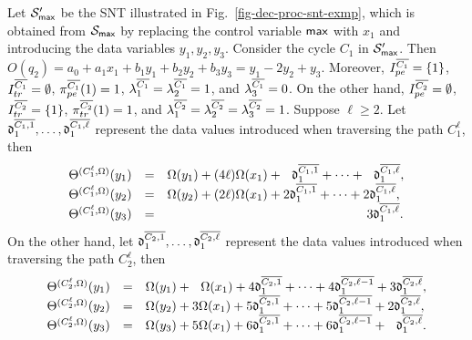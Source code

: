 \begin{example}\label{exmp-sum}
Let ${\mathcal{S} }'_{\sf max}$ be the SNT illustrated in Fig.~\ref{fig-dec-proc-snt-exmp}, which is obtained from ${\mathcal{S} }_{\sf max}$ by replacing  the control variable $\sf max$ with  $x_1$ and introducing the data variables $y_1,y_2, y_3$. Consider the cycle $C_1$ in ${\mathcal{S} }'_{\sf max}$. Then $O(q_2)= a_0 + a_1 x_1 + b_1 y_1 + b_2 y_2 + b_3 y_3 = y_1 - 2y_2 + y_3$. Moreover, $I^{\overline{C_1}}_{pe} = \{1\}$, $I^{\overline{C_1}}_{tr} = \emptyset$, $\pi^{\overline{C_1}}_{pe}(1) = 1$, $\lambda^{\overline{C_1}}_1 = \lambda^{\overline{C_1}}_2 = 1$, and $\lambda^{\overline{C_1}}_3 = 0$. On the other hand, $I^{\overline{C_2}}_{pe} = \emptyset$, $I^{\overline{C_2}}_{tr} = \{1\}$, $\pi^{\overline{C_2}}_{tr}(1) = 1$, and $\lambda^{\overline{C_2}}_1 = \lambda^{\overline{C_2}}_2 = \lambda^{\overline{C_2}}_3  = 1$. Suppose $\ell \ge 2$. Let $ \mathfrak{d}^{\overline{C_1, 1}}_1, \dots, \mathfrak{d}^{\overline{C_1, \ell}}_1$ represent the data values introduced when traversing the path $C^\ell_1$, then
\[
\begin{array}{l c l}
\sumf^{(C^\ell_1, \initval)}(y_1) &= & \initval(y_1) + (4 \ell) \initval(x_1) +\ \ \vard^{\circled{C_1, 1}}_1 + \dots +\ \ \vard^{\circled{C_1, \ell}}_1,\\
%
\sumf^{(C^\ell_1, \initval)}(y_2) &=& \initval(y_2) + (2 \ell) \initval(x_1) + 2 \vard^{\circled{C_1, 1}}_1 + \dots + 2 \vard^{\circled{C_1, \ell}}_1,\\
%
\sumf^{(C^\ell_1, \initval)}(y_3) &=& \hspace{5.5cm} 3 \vard^{\circled{C_1, \ell}}_1.
\end{array}
\] 
On the other hand, let $ \mathfrak{d}^{\overline{C_2, 1}}_1, \dots, \mathfrak{d}^{\overline{C_2, \ell}}_1$ represent the data values introduced when traversing the path $C^\ell_2$, then 
\[
\begin{array}{l c l}
\sumf^{(C^\ell_2, \initval)}(y_1) &= & \initval(y_1) +\ \  \initval(x_1) +4 \vard^{\circled{C_2, 1}}_1 + \dots +4 \vard^{\circled{C_2, \ell-1}}_1 + 3 \vard^{\circled{C_2, \ell}}_1,\\
%
\sumf^{(C^\ell_2, \initval)}(y_2) &=& \initval(y_2) + 3 \initval(x_1) + 5 \vard^{\circled{C_2, 1}}_1 + \dots + 5 \vard^{\circled{C_2, \ell-1}}_1 + 2 \vard^{\circled{C_2, \ell}}_1,\\
%
\sumf^{(C^\ell_2, \initval)}(y_3) &=& \initval(y_3) + 5 \initval(x_1) + 6 \vard^{\circled{C_2, 1}}_1 + \dots + 6 \vard^{\circled{C_2, \ell-1}}_1 + \ \ \vard^{\circled{C_2, \ell}}_1.
\end{array}
\] 


\end{example}

